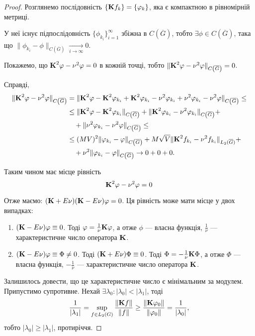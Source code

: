 \begin{proof}
	Розглянемо послідовність $\{ \bf{K}f_k \} = \{ \phi_k\}$, яка є компактною в рівномірній метриці. \medskip

	У неї існує підпослідовність $\{\phi_{k_i}\}_{i = 1}^\infty$ збіжна в $C\left(\overline G\right)$, тобто $\exists \phi \in C\left(\overline G\right)$, така що $\| \phi_{k_i} - \phi\|_{C\left(\overline G\right)} \xrightarrow[i \to \infty]{} 0$. \medskip

	Покажемо, що $\bf{K}^2 \phi - \nu^2 \phi = 0$ в кожній точці, тобто $\| \bf{K}^2\phi - \nu^2 \phi\|_{C\left(\overline G\right)} = 0$. \medskip

	Справді,
	\begin{equation}
		\begin{aligned}
			\|\bf{K}^2\phi - \nu^2\phi\|_{C\left(\overline G\right)} &= \|\bf{K}^2\phi - \bf{K}^2\phi_{k_i} + \bf{K}^2\phi_{k_i} - \nu^2\phi_{k_i} + \nu^2\phi_{k_i} - \nu^2\phi\|_{C\left(\overline G\right)} \le \\
			&\le \|\bf{K}^2\phi-\bf{K}^2\phi_{k_i}\|_{C\left(\overline G\right)} + \|\bf{K}^2\phi_{k_i}-\nu^2\phi_{k_i}\|_{C\left(\overline G\right)}+ \\
			&\quad + \|\nu^2\phi_{k_i}-\nu^2\phi\|_{C\left(\overline G\right)} \le \\
			&\le (MV)^2 \|\phi_{k_i} - \phi\|_{C\left(\overline G\right)} + M\sqrt{V} \|\bf{K}^2f_{k_i}-\nu^2f_{k_i}\|_{L_2(\overline G)} + \\
			&\quad + \nu^2 \|\phi_{k_i} - \phi\|_{C\left(\overline G\right)} \to 0 + 0 + 0.
		\end{aligned}
	\end{equation}
	
	Таким чином має місце рівність
	\begin{equation}
		\bf{K}^2 \phi - \nu^2 \phi = 0
	\end{equation}
	
	Отже маємо: $(\bf{K} + E\nu)(\bf{K} - E \nu)\phi=0$. Ця рівність може мати місце у двох випадках:
	\begin{enumerate}
		\item $(\bf{K} - E\nu) \phi \equiv 0$. Тоді $\phi = \frac{1}{\nu}\bf{K}\phi$, а отже $\phi$ --- власна функція, $\frac{1}{\nu}$ --- характеристичне число оператора $\bf{K}$.

		\item $(\bf{K} - E\nu) \phi \equiv \Phi \ne 0$. Тоді $(\bf{K} + E \nu) \Phi \equiv 0$. Тоді $\Phi = -\frac{1}{\nu}\bf{K}\Phi$, а отже $\Phi$ --- власна функція, $-\frac{1}{\nu}$ --- характеристичне число оператора $\bf{K}$.
	\end{enumerate}
	
	Залишилось довести, що це характеристичне число є мінімальним за модулем. Припустимо супротивне. Нехай $\exists \lambda_0: |\lambda_0| < |\lambda_1|$, тоді
	\begin{equation}
		\frac{1}{|\lambda_1|} = \sup_{f \in L_2(G)} \frac{\|\bf{K}f\|}{\|f\|} \ge \frac{\|\bf{K}\phi_0\|}{\|\phi_0\|} = \frac{1}{|\lambda_0|},
	\end{equation}
	тобто $|\lambda_0| \ge |\lambda_1|$, протиріччя.
\end{proof}

